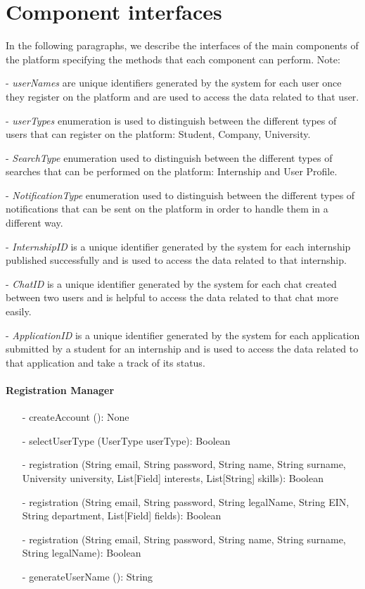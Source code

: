 \section{Component interfaces}\label{sec:component interfaces}
In the following paragraphs, we describe the interfaces of the main components of the platform specifying the methods that each component can perform.
Note: 

- \textit{userNames} are unique identifiers generated by the system for each user once they register on the platform and are used to access the data related to 
that user.

- \textit{userTypes} enumeration is used to distinguish between the different types of users that can register on the platform: Student, Company, University.

- \textit{SearchType} enumeration used to distinguish between the different types of searches that can be performed on the platform: Internship and User Profile.

- \textit{NotificationType} enumeration used to distinguish between the different types of notifications that can be sent on the platform in order to handle 
them in a different way.

- \textit{InternshipID} is a unique identifier generated by the system for each internship published successfully and is used to access the data related to 
that internship.

- \textit{ChatID} is a unique identifier generated by the system for each chat created between two users and is helpful to access the data related to that 
chat more easily.

- \textit{ApplicationID} is a unique identifier generated by the system for each application submitted by a student for an internship and is used to access 
the data related to that application and take a track of its status.
\paragraph{Registration Manager}
\begin{itemize}
    \item[-] createAccount (): None
    \item[-] selectUserType (UserType userType): Boolean
    \item[-] registration (String email, String password, String name, String surname, University university, List[Field] interests, List[String] skills): Boolean
    \item[-] registration (String email, String password, String legalName, String EIN, String department, List[Field] fields): Boolean
    \item[-] registration (String email, String password, String name, String surname, String legalName): Boolean
    \item[-] generateUserName (): String
\end{itemize}

